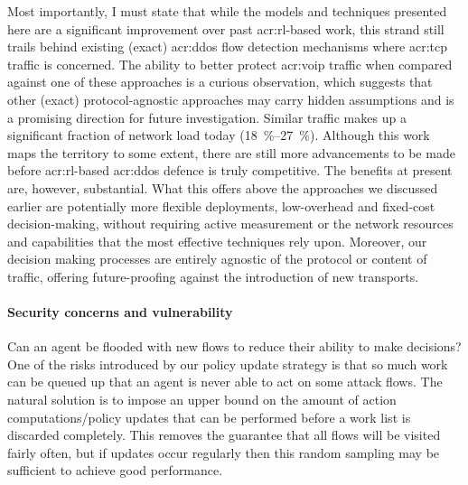 Most importantly, I must state that while the models and techniques presented here are a significant improvement over past \gls{acr:rl}-based work, this strand still trails behind existing (exact) \gls{acr:ddos} flow detection mechanisms where \gls{acr:tcp} traffic is concerned.
The ability to better protect \gls{acr:voip} traffic when compared against one of these approaches is a curious observation, which suggests that other (exact) protocol-agnostic approaches may carry hidden assumptions and is a promising direction for future investigation.
Similar traffic makes up a significant fraction of network load today (\qtyrange{18}{27}{\percent}).
Although this work maps the territory to some extent, there are still more advancements to be made before \gls{acr:rl}-based \gls{acr:ddos} defence is truly competitive.
The benefits at present are, however, substantial.
What this offers above the approaches we discussed earlier are potentially more flexible deployments, low-overhead and fixed-cost decision-making, without requiring active measurement or the network resources and capabilities that the most effective techniques rely upon.
Moreover, our decision making processes are entirely agnostic of the protocol or content of traffic, offering future-proofing against the introduction of new transports.

\paragraph{Security concerns and vulnerability}
Can an agent be flooded with new flows to reduce their ability to make decisions?
One of the risks introduced by our policy update strategy is that so much work can be queued up that an agent is never able to act on some attack flows.
The natural solution is to impose an upper bound on the amount of action computations/policy updates that can be performed before a work list is discarded completely.
This removes the guarantee that all flows will be visited fairly often, but if updates occur regularly then this random sampling may be sufficient to achieve good performance.


